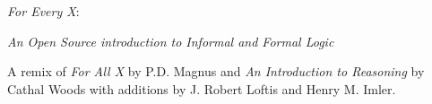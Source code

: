 \documentclass[letterpaper,twoside]{book}
\begin{document}
\huge \begin{center}\emph{For Every X}:
\end{center}
\large \emph{An Open Source introduction to Informal and Formal Logic}


\normalsize A remix of \emph{For All X} by P.D. Magnus and \emph{An Introduction to Reasoning} by Cathal Woods with additions by J. Robert Loftis and Henry M. Imler.
\end{document}
